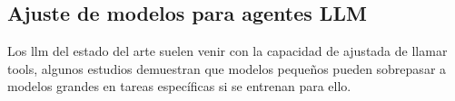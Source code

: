 \subsection{Ajuste de modelos para agentes LLM}
Los llm del estado del arte suelen venir con la capacidad de ajustada de llamar tools, algunos estudios demuestran que modelos pequeños pueden sobrepasar a modelos grandes en tareas específicas si se entrenan para ello. 




















